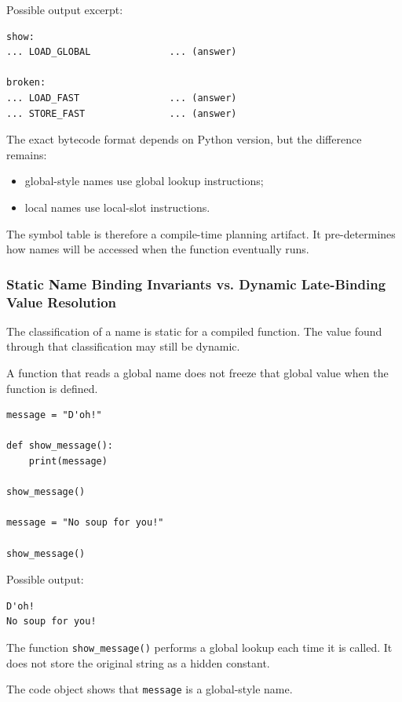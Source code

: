 Possible output excerpt:

\begin{verbatim}
show:
... LOAD_GLOBAL              ... (answer)

broken:
... LOAD_FAST                ... (answer)
... STORE_FAST               ... (answer)
\end{verbatim}

The exact bytecode format depends on Python version, but the difference remains:

\begin{itemize}
    \item global-style names use global lookup instructions;
    \item local names use local-slot instructions.
\end{itemize}

The symbol table is therefore a compile-time planning artifact. It pre-determines how names will be accessed when the function eventually runs.

\subsubsection{Static Name Binding Invariants vs. Dynamic Late-Binding Value Resolution}

The classification of a name is static for a compiled function. The value found through that classification may still be dynamic.

A function that reads a global name does not freeze that global value when the function is defined.

\begin{verbatim}
message = "D'oh!"

def show_message():
    print(message)

show_message()

message = "No soup for you!"

show_message()
\end{verbatim}

Possible output:

\begin{verbatim}
D'oh!
No soup for you!
\end{verbatim}

The function \texttt{show\_message()} performs a global lookup each time it is called. It does not store the original string as a hidden constant.

The code object shows that \texttt{message} is a global-style name.

